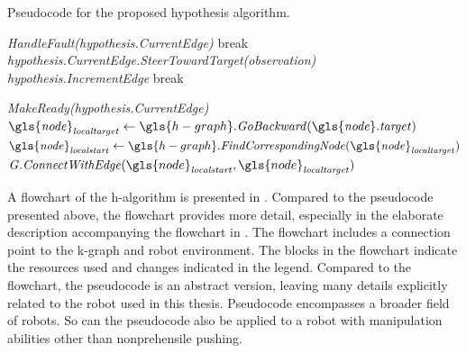 \noindent
\begin{algorithm}[H]
  \caption{Pseudocode for the proposed hypothesis algorithm.}\label{pseudocode:h-algorithm}
  \begin{algorithmic}[1]

    \hspace{-0.9cm}\colorbox{my_grey}{\parbox{\linewidth}{%

        \hspace{-0.1cm}\colorbox{my_yellow}{\parbox{\linewidth}{%

            \hspace{-0.1cm}\colorbox{my_light_blue}{\parbox{\linewidth}{%
                 
                \State \textit{HandleFault(\gls{hypothesis}.CurrentEdge)}
                \State break
                \EndIf
                \State \textit{\gls{hypothesis}.CurrentEdge.SteerTowardTarget(\gls{observation})}
                  \State \textit{\gls{hypothesis}.IncrementEdge}
                \Else
                  \State break
                \EndIf
                \EndIf
                \EndWhile
            }}
            \Else
            \State \textit{MakeReady(\gls{hypothesis}.CurrentEdge)}
            \EndIf
            \Else
            \State $\mathit{\gls{node}_{localtarget}} \leftarrow \gls{h-graph}.\mathit{GoBackward(\gls{node}.target)}$
            \State $\mathit{\gls{node}_{localstart}} \leftarrow \gls{h-graph}.\mathit{FindCorrespondingNode(\gls{node}_{localtarget})}$
            \State $\mathit{G.ConnectWithEdge}(\gls{node}_\mathit{localstart}, \gls{node}_\mathit{localtarget})$
            \EndIf
            \EndWhile
        }}
        \EndFor
    }}
  \end{algorithmic}
\end{algorithm}

A flowchart of the \ac{h-algorithm} is presented in . Compared to the pseudocode presented above, the flowchart provides more detail, especially in the elaborate description accompanying the flowchart in . The flowchart includes a connection point to the \ac{k-graph} and robot environment. The blocks in the flowchart indicate the resources used and changes indicated in the legend. Compared to the flowchart, the pseudocode is an abstract version, leaving many details explicitly related to the robot used in this thesis. Pseudocode encompasses a broader field of robots. So can the pseudocode also be applied to a robot with manipulation abilities other than nonprehensile pushing.\bs

